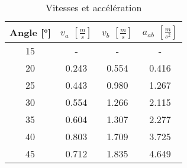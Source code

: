 \begin{table}
\centering
\begin{tabular}{|c|c|c|c|}
\hline
Angle [°] &$v_a$ $\left[ \frac{m}{s} \right]$ & $v_b$ $\left[ \frac{m}{s} \right]$ & $a_{ab}$ $\left[ \frac{m}{s^2} \right]$ \\
           \hline
15        &- & - & - \\
           \hline
20        &0.243 & 0.554 & 0.416 \\
           \hline
25        &0.443 & 0.980 & 1.267 \\
           \hline
30        &0.554 & 1.266 & 2.115 \\
           \hline
35        &0.604 & 1.307 & 2.277 \\
           \hline
40        &0.803 & 1.709 & 3.725 \\
           \hline
45        &0.712 & 1.835 & 4.649 \\
           \hline
\end{tabular}
\caption{Vitesses et accélération}
\label{table:v-aee}
\end{table}
